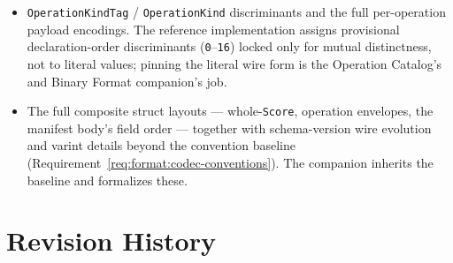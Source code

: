 \documentclass[11pt,letterpaper]{report}
\begin{document}
\begin{itemize}
  \item \texttt{OperationKindTag} / \texttt{OperationKind} discriminants
    and the full per-operation payload encodings. The reference
    implementation assigns provisional declaration-order discriminants
    (\texttt{0}--\texttt{16}) locked only for mutual distinctness, not
    to literal values; pinning the literal wire form is the
    Operation Catalog's and Binary Format companion's job.
  \item The full composite struct layouts --- whole-\texttt{Score},
    operation envelopes, the manifest body's field order --- together
    with schema-version wire evolution and varint details beyond the
    convention baseline
    (Requirement~\ref{req:format:codec-conventions}). The companion
    inherits the baseline and formalizes these.
\end{itemize}

\chapter{Revision History}
\label{app:history}
\end{document}
